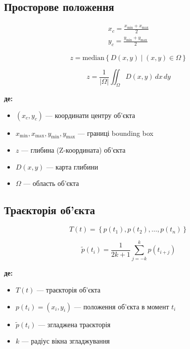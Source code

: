 \documentclass[14pt, a4paper]{extarticle}
\numberwithin{equation}{section}
\begin{document}
\subsection{Просторове положення}

\begin{align}
\boxed{x_c = \frac{x_{\min} + x_{\max}}{2}} \tag{46} \\
\boxed{y_c = \frac{y_{\min} + y_{\max}}{2}} \tag{47}
\end{align}

\begin{equation}
\boxed{z = \text{median}\left\{ D(x,y) \mid (x,y) \in \Omega \right\}} \tag{48}
\end{equation}

\begin{equation}
\boxed{z = \frac{1}{|\Omega|} \iint_{\Omega} D(x,y) \, dx\,dy} \tag{49}
\end{equation}

\textbf{де:}
\begin{itemize}
\item $(x_c, y_c)$ — координати центру об'єкта
\item $x_{\min}, x_{\max}, y_{\min}, y_{\max}$ — границі bounding box
\item $z$ — глибина (Z-координата) об'єкта
\item $D(x,y)$ — карта глибини
\item $\Omega$ — область об'єкта
\end{itemize}

\subsection{Траєкторія об'єкта}

\begin{equation}
\boxed{T(t) = \left\{ p(t_1), p(t_2), \ldots, p(t_n) \right\}} \tag{50}
\end{equation}

\begin{equation}
\boxed{\tilde{p}(t_i) = \frac{1}{2k+1} \sum_{j=-k}^{k} p(t_{i+j})} \tag{51}
\end{equation}

\textbf{де:}
\begin{itemize}
\item $T(t)$ — траєкторія об'єкта
\item $p(t_i) = (x_i, y_i)$ — положення об'єкта в момент $t_i$
\item $\tilde{p}(t_i)$ — згладжена траєкторія
\item $k$ — радіус вікна згладжування
\end{itemize}
\end{document}
